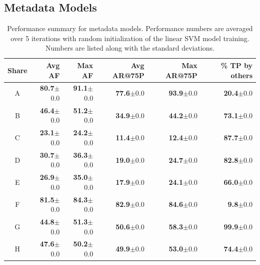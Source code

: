 \subsection{Metadata Models} 
\begin{table}[t!]
{\fontsize{8pt}{1em}\selectfont
\begin{center}
\caption{Performance summary for metadata models.  Performance
  numbers are averaged over 5 iterations with random
  initialization of the linear SVM model training. Numbers are listed
  along with the standard deviations. }
\begin{tabular}{|c|r|r|r|r|r|}
		\hline
		\textbf{Share} & \textbf{Avg AF} & \textbf{Max AF} & \textbf{Avg AR@75P} & \textbf{Max AR@75P} & \textbf{\% TP by others} \tabularnewline
		\hline
A&\textbf{80.7}$\pm$0.0&\textbf{91.1}$\pm$0.0&\textbf{77.6}$\pm$0.0&\textbf{93.9}$\pm$0.0&\textbf{20.4}$\pm$0.0\tabularnewline \hline
B&\textbf{46.4}$\pm$0.0&\textbf{51.2}$\pm$0.0&\textbf{34.9}$\pm$0.0&\textbf{44.2}$\pm$0.0&\textbf{73.1}$\pm$0.0\tabularnewline \hline
C&\textbf{23.1}$\pm$0.0&\textbf{24.2}$\pm$0.0&\textbf{11.4}$\pm$0.0&\textbf{12.4}$\pm$0.0&\textbf{87.7}$\pm$0.0\tabularnewline \hline
D&\textbf{30.7}$\pm$0.0&\textbf{36.3}$\pm$0.0&\textbf{19.0}$\pm$0.0&\textbf{24.7}$\pm$0.0&\textbf{82.8}$\pm$0.0\tabularnewline \hline
E&\textbf{26.9}$\pm$0.0&\textbf{35.0}$\pm$0.0&\textbf{17.9}$\pm$0.0&\textbf{24.1}$\pm$0.0&\textbf{66.0}$\pm$0.0\tabularnewline \hline
F&\textbf{81.5}$\pm$0.0&\textbf{84.3}$\pm$0.0&\textbf{82.9}$\pm$0.0&\textbf{84.6}$\pm$0.0&\textbf{9.8}$\pm$0.0\tabularnewline \hline
G&\textbf{44.8}$\pm$0.0&\textbf{51.3}$\pm$0.0&\textbf{50.6}$\pm$0.0&\textbf{58.3}$\pm$0.0&\textbf{99.9}$\pm$0.0\tabularnewline \hline
H&\textbf{47.6}$\pm$0.0&\textbf{50.2}$\pm$0.0&\textbf{49.9}$\pm$0.0&\textbf{53.0}$\pm$0.0&\textbf{74.4}$\pm$0.0\tabularnewline \hline
\end{tabular}
\end{center}
\label{tab:WithoutBurstsPerf} %
}
\end{table}
